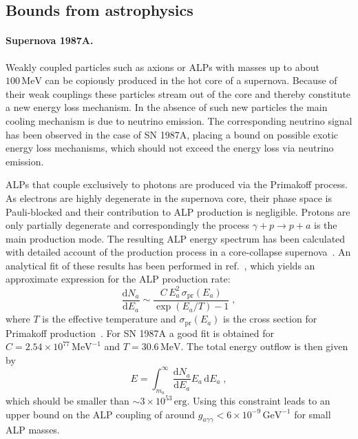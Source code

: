 \documentclass[11pt,a4paper]{article}
\newcommand{\ga}{g_{a\gamma\gamma}}
\begin{document}
\subsection{Bounds from astrophysics}

\paragraph{Supernova 1987A.}
Weakly coupled particles such as axions or ALPs with masses up to about $100\,\text{MeV}$ can be copiously produced in the hot core of a supernova. Because of their weak couplings these particles stream out of the core and thereby constitute a new energy loss mechanism. In the absence of such new particles the main cooling mechanism is due to neutrino emission. The corresponding neutrino signal has been observed in the case of SN 1987A, placing a bound on possible exotic energy loss mechanisms, which should not exceed the energy loss via neutrino emission.

ALPs that couple exclusively to photons are produced via the Primakoff process. As electrons are highly degenerate in the supernova core, their phase space is Pauli-blocked and their contribution to ALP production is negligible. Protons are only partially degenerate and correspondingly the process $\gamma + p \rightarrow p + a$ is the main production mode. The resulting ALP energy spectrum has been calculated with detailed account of the production process in a core-collapse supernova~\cite{Payez:2014xsa}. An analytical fit of these results has been performed in ref.~\cite{Jaeckel:2017tud}, which yields an approximate expression for the ALP production rate:
\begin{equation}
\frac{\mathrm{d}N_{a}}{\mathrm{d}E_a} \sim \frac{C \, E_a^2 \, \sigma_\text{pr}(E_a)}{\exp(E_a/T)-1} \; ,
\end{equation}
where $T$ is the effective temperature and $\sigma_\text{pr}(E_a)$ is the cross section for Primakoff production~\cite{Cadamuro:2011fd}. For SN 1987A a good fit is obtained for $C = 2.54 \times 10^{77} \, \mathrm{MeV^{-1}}$ and $T = 30.6 \,\mathrm{MeV}$. The total energy outflow is then given by 
\begin{equation}
E = \int_{m_a}^{\infty} \frac{\mathrm{d}N_{a}}{\mathrm{d}E_a} E_a \,\mathrm{d}E_a \; ,
\end{equation}
which should be smaller than $ \sim 3 \times 10^{53}\,\text{erg}$. Using this constraint leads to an upper bound on the ALP coupling of around $\ga < 6 \times 10^{-9} \, \text{GeV}^{-1}$ for small ALP masses.
\end{document}
